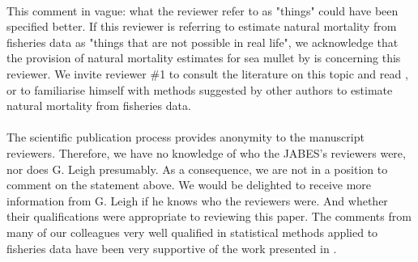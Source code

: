 \documentclass[11pt]{article}
\begin{document}
\begin{spacing}{1.2}
 \\
This comment in vague: what the reviewer refer to as "things" could have been specified better. If this reviewer is referring to estimate natural mortality from fisheries data as "things that are not possible in real life", we acknowledge that the provision of natural mortality estimates for sea mullet by \cite{Kienzle2015} is concerning this reviewer. We invite reviewer \#1 to consult the literature on this topic and read \cite{lee11a}, or \cite{Wang99a} to familiarise himself with methods suggested by other authors to estimate natural mortality from fisheries data.\\

 \\
The scientific publication process provides anonymity to the manuscript reviewers. Therefore, we have no knowledge of who the JABES's reviewers were, nor does G. Leigh presumably. As a consequence, we are not in a position to comment on the statement above. We would be delighted to receive more information from G. Leigh if he knows who the reviewers were. And whether their qualifications were appropriate to reviewing this paper. The comments from many of our colleagues very well qualified in statistical methods applied to fisheries data have been very supportive of the work presented in \cite{kienzle2015}.\\
 

\end{spacing}
\end{document}
